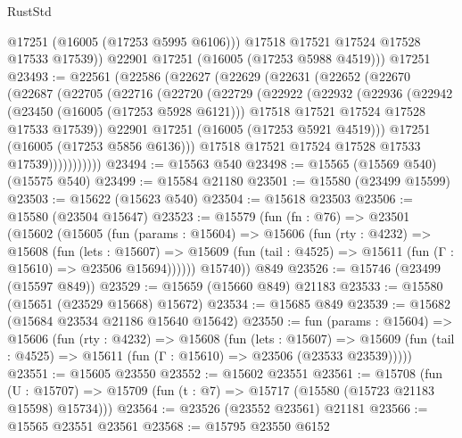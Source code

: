 \begin{lexlean}{RustStd}
\begin{coremodule}
            @17251
            (@16005 (@17253 @5995 @6106)))
          @17518
          @17521
          @17524
          @17528
          @17533
          @17539))
      @22901
      @17251
      (@16005 (@17253 @5988 @4519)))
    @17251
@23493 := @22561
    (@22586
      (@22627
        (@22629
          (@22631
            (@22652
              (@22670
                (@22687
                  (@22705
                    (@22716
                      (@22720
                        (@22729
                          (@22922
                            (@22932
                              (@22936
                                (@22942
                                  (@23450 (@16005 (@17253 @5928 @6121)))
                                  @17518
                                  @17521
                                  @17524
                                  @17528
                                  @17533
                                  @17539))
                              @22901
                              @17251
                              (@16005 (@17253 @5921 @4519)))
                            @17251
                            (@16005 (@17253 @5856 @6136)))
                          @17518
                          @17521
                          @17524
                          @17528
                          @17533
                          @17539)))))))))))
@23494 := @15563 @540
@23498 := @15565 (@15569 @540) (@15575 @540)
@23499 := @15584 @21180
@23501 := @15580 (@23499 @15599)
@23503 := @15622 (@15623 @540)
@23504 := @15618 @23503
@23506 := @15580 (@23504 @15647)
@23523 := @15579
    (fun (fn : @76) =>
    @23501
      (@15602
        (@15605
          (fun (params : @15604) =>
          @15606
            (fun (rty : @4232) =>
            @15608
              (fun (lets : @15607) =>
              @15609 (fun (tail : @4525) => @15611 (fun (Γ : @15610) => @23506 @15694))))))
        @15740))
    @849
@23526 := @15746 (@23499 (@15597 @849))
@23529 := @15659 (@15660 @849) @21183
@23533 := @15580 (@15651 (@23529 @15668) @15672)
@23534 := @15685 @849
@23539 := @15682 (@15684 @23534 @21186 @15640 @15642)
@23550 := fun (params : @15604) =>
  @15606
    (fun (rty : @4232) =>
    @15608
      (fun (lets : @15607) =>
      @15609 (fun (tail : @4525) => @15611 (fun (Γ : @15610) => @23506 (@23533 @23539)))))
@23551 := @15605 @23550
@23552 := @15602 @23551
@23561 := @15708
    (fun (U : @15707) => @15709 (fun (t : @7) => @15717 (@15580 (@15723 @21183 @15598) @15734)))
@23564 := @23526 (@23552 @23561) @21181
@23566 := @15565 @23551 @23561
@23568 := @15795 @23550 @6152

\end{coremodule}
\end{lexlean}
